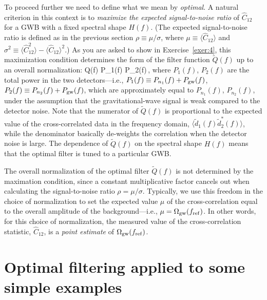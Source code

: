 To proceed further we need to define what we mean by
{\em optimal}.
A natural criterion in this context is to 
{\em maximize the expected signal-to-noise ratio} 
of $\hat C_{12}$ 
for a GWB with a fixed spectral shape $H(f)$.
(The expected signal-to-noise ratio is defined as 
in the previous section
$\rho\equiv \mu/\sigma$, where 
$\mu\equiv\langle \hat C_{12}\rangle$
and 
$\sigma^2\equiv \langle \hat C_{12}^2\rangle -\langle
\hat C_{12}\rangle^2$.) 
As you are asked to show in Exercise~\ref{exer:4},
this maximization condition  determines the form of the 
filter 
function $\tilde Q(f)$ up to an overall normalization:
%
\be
\tilde Q(f) \propto {}
{P_1(f) P_2(f)}\,,
\ee
%
where $P_1(f)$, $P_2(f)$ are the total power in the two
detectors---i.e., 
$P_1(f) \equiv P_{n_1}(f) + P_{\rm gw}(f)$,
$P_2(f) \equiv P_{n_2}(f) + P_{\rm gw}(f)$, 
which are approximately equal to 
$P_{n_1}(f)$, $P_{n_2}(f)$, under the assumption that 
the gravitational-wave signal is 
weak compared to the detector noise.
Note that the numerator of $\tilde Q(f)$ is proportional
to the expected value of the cross-correlated data in
the frequency domain, 
$\langle \tilde d_1(f)\tilde d_2^*(f)\rangle$,
while the denominator basically de-weights the 
correlation when the detector noise is large.
The dependence of $\tilde Q(f)$ on the spectral shape
$H(f)$ means that the optimal filter is tuned to a 
particular GWB.

The overall normalization of the optimal filter $\tilde Q(f)$ 
is not determined by the maximation condition, since
a constant multiplicative factor cancels out when
calculating  the signal-to-noise ratio $\rho=\mu/\sigma$.  
Typically, we use this freedom in the choice of 
normalization to set the expected value $\mu$ of the
cross-correlation equal to the overall amplitude of 
the background---i.e., $\mu = \Omega_{\rm gw}(f_{\rm ref})$.
In other words, for this choice of normalization, 
the measured value of the 
cross-correlation statistic, $\hat C_{12}$, is a 
{\em point estimate} of $\Omega_{\rm gw}(f_{\rm ref})$.

\section{Optimal filtering applied to some simple examples}
\label{s:simple_examples}

